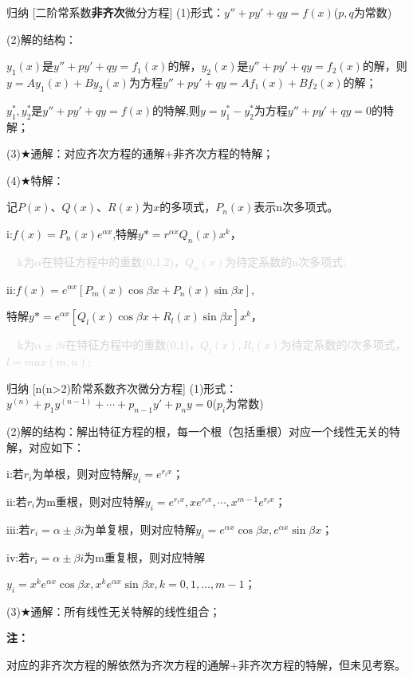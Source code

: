 \documentclass[a4paper,12pt,oneside,fontset=none]{ctexbook}
\newenvironment{induction}[1][]{\begin{thmBox}{归纳}{#1}}{\end{thmBox}}
\newenvironment{note}{
    \par\vspace{0.5em}\noindent
    \textbf{\color{NoteColor} 注：}
}{
    \par\vspace{0.5em}
}
\numberwithin{equation}{chapter}
\begin{document}
\begin{induction}
    [二阶常系数\textbf{非齐次}微分方程]
    (1)形式：$y''+py'+qy=f(x)$($p,q$为常数)

    (2)解的结构：
    
    $y_1(x)$是$y''+py'+qy=f_1(x)$的解，$y_2(x)$是$y''+py'+qy=f_2(x)$的解，则$y=Ay_1(x)+By_2(x)$为方程$y''+py'+qy=Af_1(x)+Bf_2(x)$的解；

    $y_1^*,y_2^*$是$y''+py'+qy=f(x)$的特解,则$y=y_1^*-y_2^*$为方程$y''+py'+qy=0$的特解；

    (3)$\bigstar$通解：对应齐次方程的通解+非齐次方程的特解；

    (4)$\bigstar$特解：
    
    记$P(x)、Q(x)、R(x)$为$x$的多项式，$P_n(x)$表示n次多项式。

    i:$f(x) = P_n(x)e^{\alpha x}$,特解$y* = r^{\alpha x}Q_n(x)x^k$，
    
    \textcolor{lightgray}{$\quad$k为$\alpha$在特征方程中的重数(0,1,2)，$Q_n(x)$为待定系数的n次多项式;}


    ii:$f(x) = e^{\alpha x}[P_m(x)\cos \beta x + P_n(x)\sin \beta x]$,
    
    特解$y* = e^{\alpha x}[Q_l(x)\cos \beta x+R_l(x)\sin \beta x]x^k$，

    \textcolor{lightgray}{$\quad$k为$\alpha \pm \beta i$在特征方程中的重数(0,1)，$Q_l(x),R_l(x)$为待定系数的$l$次多项式，$l=max(m,n)$;}
\end{induction}

\begin{induction}
    [n(n>2)阶常系数齐次微分方程]
    (1)形式：$y^{(n)}+p_1y^{(n-1)}+\cdots+p_{n-1}y'+p_ny=0$($p_i$为常数)

    (2)解的结构：解出特征方程的根，每一个根（包括重根）对应一个线性无关的特解，对应如下：

    i:若$r_i$为单根，则对应特解$y_i=e^{r_ix}$；

    ii:若$r_i$为m重根，则对应特解$y_i=e^{r_ix},xe^{r_ix},\cdots,x^{m-1}e^{r_ix}$；

    iii:若$r_i=\alpha \pm \beta i$为单复根，则对应特解$y_i=e^{\alpha x}\cos \beta x,e^{\alpha x}\sin \beta x$；

    iv:若$r_i=\alpha \pm \beta i$为m重复根，则对应特解
    
    $y_i=x^{k}e^{\alpha x}\cos \beta x,x^{k}e^{\alpha x}\sin \beta x, k =0,1,\ldots,m-1$；

    (3)$\bigstar$通解：所有线性无关特解的线性组合；
\end{induction}
\begin{note}
    对应的非齐次方程的解依然为齐次方程的通解+非齐次方程的特解，但未见考察。
\end{note}
\end{document}
